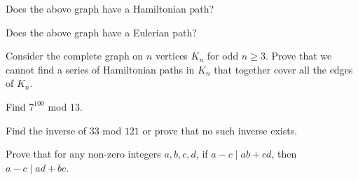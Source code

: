 \documentclass[12pt,twoside]{article}
\begin{document}
\begin{problem}{10}
\bparts
{} Does the above graph have a Hamiltonian path?

 Does the above graph have a Eulerian path?

 Consider the complete graph on $n$ vertices $K_n$ for odd $n \geq 3$.  Prove that we cannot find a series of Hamiltonian paths in $K_n$ that together cover all the edges of $K_n$.  

\eparts
\end{problem}





\begin{problem}{10}
\bparts
{}  Find $7^{100}$ mod $13$.

 Find the inverse of $33$ mod $121$ or prove that no such inverse exists.

 Prove that for any non-zero integers $a, b, c, d$, if $a - c \mid ab + cd$, then $a - c \mid ad + bc$.

\eparts
\end{problem}





\begin{problem}{10}
\bparts
\ppart{}
\eparts
\end{problem}
\end{document}
